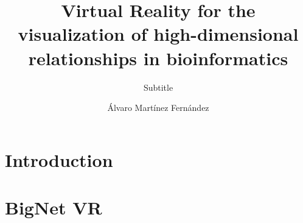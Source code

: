 \documentclass[USenglish]{uit-thesis}
\begin{document}

\title{Virtual Reality for the visualization of high-dimensional relationships in bioinformatics}
\subtitle{Subtitle}%
\author{\'Alvaro Mart\'inez Fern\'andez}

\pgfplotsset{width=\textwidth}

\maketitle

\frontmatter

\iffalse
\begin{dedication}
To...

Thanks for...
\end{dedication}


\begin{epigraph}
\epigraphitem{Simplicity is prerequisite for reliability.}{Edsger Dijkstra}
\epigraphitem{Beware of bugs in the above code;\\I have only proved it correct, not tried it.}{Donald Knuth}
\end{epigraph}

\begin{abstract}
This is the abstract, blah blah blah.
\end{abstract}

\begin{acknowledgement}
Thank you for blah blah blah
\end{acknowledgement}
\fi

\tableofcontents

\mainmatter

\chapter{Introduction}


\chapter{BigNet VR}

\end{document}
